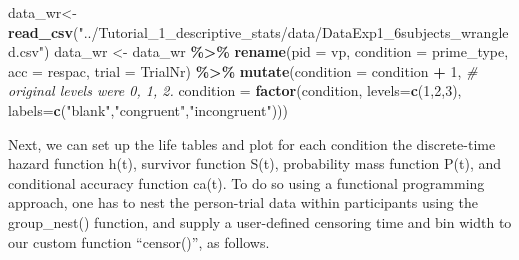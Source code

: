 \documentclass[
  man, donotrepeattitle,floatsintext]{apa6}
\newenvironment{Shaded}{\begin{snugshade}}{\end{snugshade}}
\newcommand{\AttributeTok}[1]{\textcolor[rgb]{0.13,0.29,0.53}{#1}}
\newcommand{\CommentTok}[1]{\textcolor[rgb]{0.56,0.35,0.01}{\textit{#1}}}
\newcommand{\DecValTok}[1]{\textcolor[rgb]{0.00,0.00,0.81}{#1}}
\newcommand{\FunctionTok}[1]{\textcolor[rgb]{0.13,0.29,0.53}{\textbf{#1}}}
\newcommand{\NormalTok}[1]{#1}
\newcommand{\OtherTok}[1]{\textcolor[rgb]{0.56,0.35,0.01}{#1}}
\newcommand{\SpecialCharTok}[1]{\textcolor[rgb]{0.81,0.36,0.00}{\textbf{#1}}}
\newcommand{\StringTok}[1]{\textcolor[rgb]{0.31,0.60,0.02}{#1}}
\begin{document}
\begin{Shaded}
\begin{Highlighting}[]
\NormalTok{data\_wr}\OtherTok{\textless{}{-}}\FunctionTok{read\_csv}\NormalTok{(}\StringTok{"../Tutorial\_1\_descriptive\_stats/data/DataExp1\_6subjects\_wrangled.csv"}\NormalTok{)}
\NormalTok{data\_wr }\OtherTok{\textless{}{-}}\NormalTok{ data\_wr }\SpecialCharTok{\%\textgreater{}\%} 
  \FunctionTok{rename}\NormalTok{(}\AttributeTok{pid =}\NormalTok{ vp, }\AttributeTok{condition =}\NormalTok{ prime\_type, }\AttributeTok{acc =}\NormalTok{ respac, }\AttributeTok{trial =}\NormalTok{ TrialNr) }\SpecialCharTok{\%\textgreater{}\%} 
  \FunctionTok{mutate}\NormalTok{(}\AttributeTok{condition =}\NormalTok{ condition }\SpecialCharTok{+} \DecValTok{1}\NormalTok{, }\CommentTok{\# original levels were 0, 1, 2.}
         \AttributeTok{condition =} \FunctionTok{factor}\NormalTok{(condition, }
                            \AttributeTok{levels=}\FunctionTok{c}\NormalTok{(}\DecValTok{1}\NormalTok{,}\DecValTok{2}\NormalTok{,}\DecValTok{3}\NormalTok{), }
                            \AttributeTok{labels=}\FunctionTok{c}\NormalTok{(}\StringTok{"blank"}\NormalTok{,}\StringTok{"congruent"}\NormalTok{,}\StringTok{"incongruent"}\NormalTok{)))}
\end{Highlighting}
\end{Shaded}

\normalsize

Next, we can set up the life tables and plot for each condition the discrete-time hazard function h(t), survivor function S(t), probability mass function P(t), and conditional accuracy function ca(t). To do so using a functional programming approach, one has to nest the person-trial data within participants using the group\_nest() function, and supply a user-defined censoring time and bin width to our custom function ``censor()'', as follows.

\footnotesize
\end{document}
